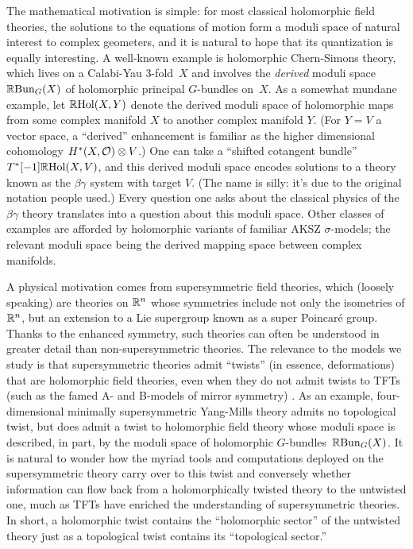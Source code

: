 \documentclass[11pt]{amsart}
\begin{document}
The mathematical motivation is simple:
for most classical holomorphic field theories, the solutions to the equations of motion form a moduli space of natural interest to complex geometers,
and it is natural to hope that its quantization is equally interesting.
A well-known example is holomorphic Chern-Simons theory,
which lives on a Calabi-Yau 3-fold~$X$ and involves the {\em derived} moduli space $\mathbb R{\rm Bun}_G(X)$ of holomorphic principal $G$-bundles on~$X$.
As a somewhat mundane example, let $\mathbb R{\rm Hol}(X,Y)$ denote the derived moduli space of holomorphic maps from some complex manifold $X$ to another complex manifold $Y$.
(For $Y = V$ a vector space, a ``derived'' enhancement is familiar as the higher dimensional cohomology $H^*(X, \mathcal O) \otimes V$.)
One can take a ``shifted cotangent bundle'' $T^*[-1] \mathbb R{\rm Hol}(X,V)$,
and this derived moduli space encodes solutions to
a theory known as the $\beta\gamma$ system with target $V$.
(The name is silly: it's due to the original notation people used.)
Every question one asks about the classical physics of the $\beta\gamma$ theory translates into a question about this moduli space.
Other classes of examples are afforded by holomorphic variants of familiar AKSZ $\sigma$-models; the relevant moduli space being the derived mapping space between complex manifolds. 

A physical motivation comes from supersymmetric field theories, 
which (loosely speaking) are theories on $\mathbb R^n$ whose symmetries include not only the isometries of $\mathbb R^n$, but an extension to a Lie supergroup known as a super Poincar\'e group.
Thanks to the enhanced symmetry, such theories can often be understood in greater detail than non-supersymmetric theories.
The relevance to the models we study is that supersymmetric theories admit ``twists'' (in essence, deformations) that are holomorphic field theories, 
even when they do not admit twists to TFTs (such as the famed A- and B-models of mirror symmetry) \cite{CosHol}.
As an example, four-dimensional minimally supersymmetric Yang-Mills theory admits no topological twist, but does admit a twist to holomorphic field theory whose moduli space is described, in part, by the moduli space of holomorphic $G$-bundles~$\mathbb R {\rm Bun}_G(X)$. 
It is natural to wonder how the myriad tools and computations deployed on the supersymmetric theory carry over to this twist and conversely whether information can flow back from a holomorphically twisted theory to the untwisted one, 
much as TFTs have enriched the understanding of supersymmetric theories.
In short, a holomorphic twist contains the ``holomorphic sector'' of the untwisted theory just as a topological twist contains its ``topological sector.''
\end{document}
